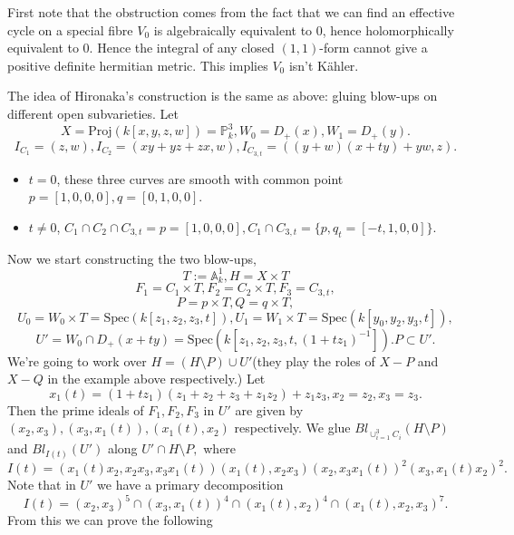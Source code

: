 \documentclass[../main.tex]{subfiles}
\begin{document}
\begin{example}

\end{example}
\begin{example}
First note that the obstruction comes from the fact that we can find an effective cycle on a special fibre $V_{0}$ is algebraically equivalent to $0$, hence holomorphically equivalent to $0$. Hence the integral of any closed $(1,1)$-form cannot give a positive definite hermitian metric. This implies $V_{0}$ isn't Kähler. 

The idea of Hironaka's construction is the same as above: gluing blow-ups on different open subvarieties. Let 
$$X=\mathrm{Proj}(k[x,y,z,w])=\mathbb{P}_{k}^{3},W_{0}=D_{+}(x), W_{1}=D_{+}(y).$$
$$I_{C_{1}}=(z,w), I_{C_{2}}=(xy+yz+zx,w), I_{C_{3,t}}=((y+w)(x+ty)+yw,z).$$
\begin{itemize}
\item $t=0$, these three curves are smooth with common point $p=[1,0,0,0], q=[0,1,0,0].$
\item $t\neq 0$, $C_{1}\cap C_{2}\cap C_{3,t}=p=[1,0,0,0], C_{1}\cap C_{3,t}=\{p,q_{t}=[-t,1 ,0,0]\}.$
\end{itemize}
Now we start constructing the two blow-ups, 
$$T:=\mathbb{A}_{k}^{1}, H=X\times T$$
$$F_{1}=C_{1}\times T, F_{2}=C_{2}\times T, F_{3}=C_{3,t},$$
$$P=p\times T, Q=q\times T,$$
$$U_{0}=W_{0}\times T=\mathrm{Spec}(k[z_{1},z_{2},z_{3},t]), U_{1}=W_{1}\times T=\mathrm{Spec}(k[y_{0},y_{2},y_{3},t]),$$
$$U'=W_{0}\cap D_{+}(x+ty)=\mathrm{Spec}(k[z_{1},z_{2},z_{3},t, (1+tz_{1})^{-1}]). P\subset U'.$$
We're going to work over $H=(H\setminus P)\cup U'$(they play the roles of $X-P$ and $X-Q$ in the example above respectively.) Let 
$$x_{1}(t)=(1+tz_{1})(z_{1}+z_{2}+z_{3}+z_{1}z_{2})+z_{1}z_{3}, x_{2}=z_{2}, x_{3}=z_{3}.$$
Then the prime ideals of $F_{1}, F_{2}, F_{3}$ in $U'$ are given by $(x_{2},x_{3}), (x_{3}, x_{1}(t)), (x_{1}(t), x_{2})$ respectively. We glue $Bl_{\cup_{i=1}^{3}C_{i}}(H\setminus P)$ and $Bl_{I(t)}(U')$ along $U'\cap H\setminus P,$ where 
$$I(t)=(x_{1}(t)x_{2},x_{2}x_{3}, x_{3}x_{1}(t))(x_{1}(t), x_{2}x_{3})(x_{2},x_{3}x_{1}(t))^{2}(x_{3},x_{1}(t)x_{2})^{2}.$$
Note that in $U'$ we have a primary decomposition
$$I(t)=(x_{2},x_{3})^{5}\cap(x_{3},x_{1}(t))^{4}\cap(x_{1}(t),x_{2})^{4}\cap(x_{1}(t), x_{2}, x_{3})^{7}.$$
From this we can prove the following 
\begin{itemize}

\end{itemize}
\end{example}
\end{document}
